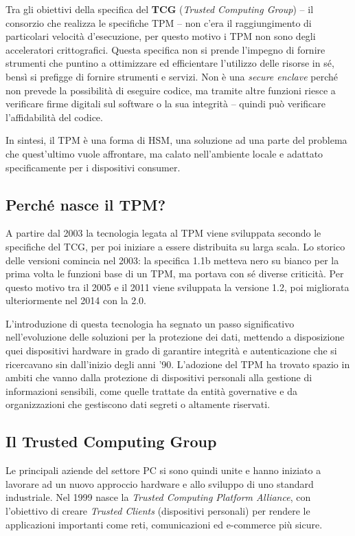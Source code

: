 Tra gli obiettivi della specifica del \textbf{TCG} (\textit{Trusted Computing Group}) -- il consorzio che realizza le specifiche TPM -- non c’era il raggiungimento di particolari velocità d’esecuzione, per questo motivo i TPM non sono degli acceleratori crittografici. Questa specifica non si prende l’impegno di fornire strumenti che puntino a ottimizzare ed efficientare l'utilizzo delle risorse in sé, bensì si prefigge di fornire strumenti e servizi.
Non è una \textit{secure enclave} perché non prevede la possibilità di eseguire codice, ma tramite altre funzioni riesce a verificare firme digitali sul software o la sua integrità -- quindi può verificare l’affidabilità del codice.

In sintesi, il TPM è una forma di HSM, una soluzione ad una parte del problema che quest’ultimo vuole affrontare, ma calato nell’ambiente locale e adattato specificamente per i dispositivi consumer.

\subsection{Perché nasce il TPM?}
A partire dal 2003 la tecnologia legata al TPM viene sviluppata secondo le specifiche del TCG, per poi iniziare a essere distribuita su larga scala.
Lo storico delle versioni comincia nel 2003: la specifica 1.1b metteva nero su bianco per la prima volta le funzioni base di un TPM, ma portava con sé diverse criticità. Per questo motivo tra il 2005 e il 2011 viene sviluppata la versione 1.2, poi migliorata ulteriormente nel 2014 con la 2.0.

L'introduzione di questa tecnologia ha segnato un passo significativo nell'evoluzione delle soluzioni per la protezione dei dati, mettendo a disposizione quei dispositivi hardware in grado di garantire integrità e autenticazione che si ricercavano sin dall’inizio degli anni ’90. L’adozione del TPM ha trovato spazio in ambiti che vanno dalla protezione di dispositivi personali alla gestione di informazioni sensibili, come quelle trattate da entità governative e da organizzazioni che gestiscono dati segreti o altamente riservati.

\subsection{Il Trusted Computing Group}
Le principali aziende del settore PC si sono quindi unite e hanno iniziato a lavorare ad un nuovo approccio hardware e allo sviluppo di uno standard industriale. Nel 1999 nasce la \textit{Trusted Computing Platform Alliance}, con l’obiettivo di creare \textit{Trusted Clients} (dispositivi personali) per rendere le applicazioni importanti come reti, comunicazioni ed e-commerce più sicure.

